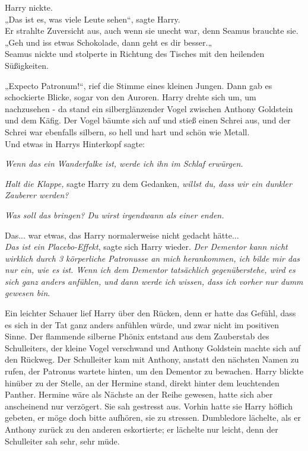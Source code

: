 {Harry nickte.\\ „Das ist es, was viele Leute sehen“, sagte Harry.\\ Er strahlte Zuversicht aus, auch wenn sie unecht war, denn Seamus brauchte sie.\\ „Geh und iss etwas Schokolade, dann geht es dir besser.„\\ Seamus nickte und stolperte in Richtung des Tisches mit den heilenden Süßigkeiten.

„Expecto Patronum!“, rief die Stimme eines kleinen Jungen. Dann gab es schockierte Blicke, sogar von den Auroren. Harry drehte sich um, um nachzusehen - da stand ein silberglänzender Vogel zwischen Anthony Goldstein und dem Käfig. Der Vogel bäumte sich auf und stieß einen Schrei aus, und der Schrei war ebenfalls silbern, so hell und hart und schön wie Metall.\\ Und etwas in Harrys Hinterkopf sagte:

\emph{Wenn das ein Wanderfalke ist, werde ich ihn im Schlaf erwürgen.}

\emph{Halt die Klappe,} sagte Harry zu dem Gedanken, \emph{willst du, dass wir ein dunkler Zauberer werden?}

\emph{Was soll das bringen? Du wirst irgendwann als einer enden.}

Das... war etwas, das Harry normalerweise nicht gedacht hätte...\\ \emph{Das ist ein Placebo-Effekt}, sagte sich Harry wieder. \emph{Der Dementor kann nicht wirklich durch 3 körperliche Patronusse an mich herankommen, ich bilde mir das nur ein, wie es ist. Wenn ich dem Dementor tatsächlich gegenüberstehe, wird es sich ganz anders anfühlen, und dann werde ich wissen, dass ich vorher nur dumm gewesen bin}.

Ein leichter Schauer lief Harry über den Rücken, denn er hatte das Gefühl, dass es sich in der Tat ganz anders anfühlen würde, und zwar nicht im positiven Sinne. Der flammende silberne Phönix entstand aus dem Zauberstab des Schulleiters, der kleine Vogel verschwand und Anthony Goldstein machte sich auf den Rückweg. Der Schulleiter kam mit Anthony, anstatt den nächsten Namen zu rufen, der Patronus wartete hinten, um den Dementor zu bewachen. Harry blickte hinüber zu der Stelle, an der Hermine stand, direkt hinter dem leuchtenden Panther. Hermine wäre als Nächste an der Reihe gewesen, hatte sich aber anscheinend nur verzögert. Sie sah gestresst aus. Vorhin hatte sie Harry höflich gebeten, er möge doch bitte aufhören, sie zu stressen. Dumbledore lächelte, als er Anthony zurück zu den anderen eskortierte; er lächelte nur leicht, denn der Schulleiter sah sehr, sehr müde.

}
